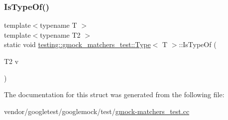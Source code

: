 \mbox{\label{structtesting_1_1gmock__matchers__test_1_1_type_a5451b10be4ff47bd2dc3741eb70dde59}} 
\subsubsection{\texorpdfstring{Is\+Type\+Of()}{IsTypeOf()}\hspace{0.1cm}{\footnotesize\ttfamily [2/2]}}
{\footnotesize\ttfamily template$<$typename T $>$ \\
template$<$typename T2 $>$ \\
static void \hyperlink{structtesting_1_1gmock__matchers__test_1_1_type}{testing\+::gmock\+\_\+matchers\+\_\+test\+::\+Type}$<$ T $>$\+::Is\+Type\+Of (\begin{DoxyParamCaption}\item[{T2}]{v }\end{DoxyParamCaption})\hspace{0.3cm}{\ttfamily [static]}}



The documentation for this struct was generated from the following file\+:\begin{DoxyCompactItemize}
\item 
vendor/googletest/googlemock/test/\hyperlink{gmock-matchers__test_8cc}{gmock-\/matchers\+\_\+test.\+cc}\end{DoxyCompactItemize}
